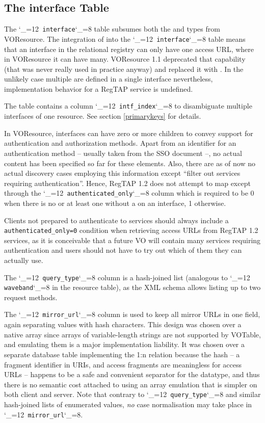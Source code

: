 \documentclass[11pt,a4paper]{ivoa}
\makeatletter
\def\rtent#1{\texttt{\color{rtcolor}\verb|#1|}}
\def\makeunderscoreletter{\catcode`\_=12}
\def\makeunderscoresubscript{\catcode`\_=8}
\def\rtent{\makeunderscoreletter\relax\rt@nt}
\def\rt@nt#1{\texttt{\color{rtcolor} #1}\makeunderscoresubscript{}}
\makeatother
\begin{document}
\subsection{The interface Table}

\label{table_interface}

The \rtent{interface} table subsumes both the
 and  types from
VOResource.  The integration of   into
the \rtent{interface}  table means that an interface in the
relational registry can only have one access URL, where in VOResource it
can have many.  VOResource 1.1 deprecated that capability (that was
never really used in practice anyway) and replaced it with
.
In the unlikely case multiple  are defined in a single
interface nevertheless, implementation behavior for a RegTAP service is
undefined.

The table contains a column \rtent{intf_index} to disambiguate
multiple interfaces of one resource. See section \ref{primarykeys} for details.

In VOResource, interfaces can have zero or more 
children to convey support for authentication and authorization methods.
Apart from an identifier for an authentication method -- usually taken
from the SSO document \citet{2017ivoa.spec.0524T} --, no actual content
has been specified so far for these elements.  Also, there are as of now
no actual discovery cases employing this information except ``filter out
services requiring authentication''.  Hence, RegTAP 1.2 does not attempt
to map  except through the
\rtent{authenticated_only} column which is required to be 0 when there
is no  or at least one 
without a  on an
interface, 1 otherwise.

Clients not prepared to authenticate to services should always include a
\verb|authenticated_only=0| condition when retrieving access URLs
from RegTAP 1.2 services, as it is conceivable that a future VO will
contain many services requiring authentication and users should not have
to try out which of them they can actually use.

The \rtent{query_type} column is a hash-joined list (analogous
to \rtent{waveband} in the resource table), as
the XML schema allows listing up to two request methods.

The \rtent{mirror_url} column is used to keep all mirror URLs in one
field, again separating values with hash characters.  This design was
chosen over a native array since arrays of variable-length strings are
not supported by VOTable, and emulating them is a major implementation
liability.  It was chosen over a separate database table implementing
the 1:n relation because the hash -- a fragment identifier in URIs, and
access fragments are meaningless for access URLs -- happens to be a safe and
convenient separator for the datatype, and thus there is no semantic
cost attached to using an array emulation that is simpler on both client
and server.  Note that contrary to \rtent{query_type} and similar
hash-joined lists of enumerated values, \emph{no} case normalisation
may take place in \rtent{mirror_url}.
\end{document}
